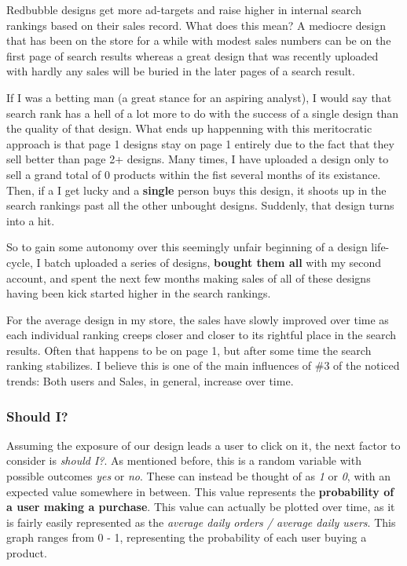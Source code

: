 \documentclass[]{article}
\begin{document}
Redbubble designs get more ad-targets and raise higher in internal
search rankings based on their sales record. What does this mean? A
mediocre design that has been on the store for a while with modest sales
numbers can be on the first page of search results whereas a great
design that was recently uploaded with hardly any sales will be buried
in the later pages of a search result.

If I was a betting man (a great stance for an aspiring analyst), I would
say that search rank has a hell of a lot more to do with the success of
a single design than the quality of that design. What ends up happenning
with this meritocratic approach is that page 1 designs stay on page 1
entirely due to the fact that they sell better than page 2+ designs.
Many times, I have uploaded a design only to sell a grand total of 0
products within the fist several months of its existance. Then, if a I
get lucky and a \textbf{single} person buys this design, it shoots up in
the search rankings past all the other unbought designs. Suddenly, that
design turns into a hit.

So to gain some autonomy over this seemingly unfair beginning of a
design life-cycle, I batch uploaded a series of designs, \textbf{bought
them all} with my second account, and spent the next few months making
sales of all of these designs having been kick started higher in the
search rankings.

For the average design in my store, the sales have slowly improved over
time as each individual ranking creeps closer and closer to its rightful
place in the search results. Often that happens to be on page 1, but
after some time the search ranking stabilizes. I believe this is one of
the main influences of \#3 of the noticed trends: Both users and Sales,
in general, increase over time.

\subsubsection{Should I?}\label{should-i}

Assuming the exposure of our design leads a user to click on it, the
next factor to consider is \emph{should I?}. As mentioned before, this
is a random variable with possible outcomes \emph{yes} or \emph{no}.
These can instead be thought of as \emph{1} or \emph{0}, with an
expected value somewhere in between. This value represents the
\textbf{probability of a user making a purchase}. This value can
actually be plotted over time, as it is fairly easily represented as the
\emph{average daily orders / average daily users}. This graph ranges
from 0 - 1, representing the probability of each user buying a product.
\end{document}
